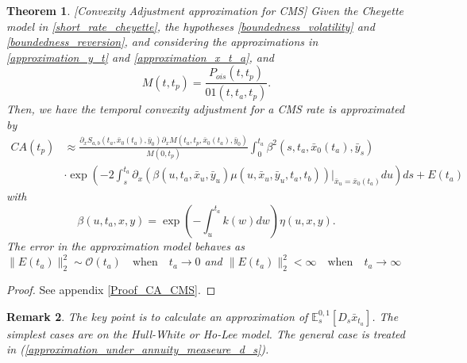\documentclass[a4paper,10pt]{article}
\newtheorem{theorem}{Theorem}[section]
\newtheorem{remark}[theorem]{Remark}
\newcommand{\1}{\mathbf{1}}
\begin{document}
\begin{theorem}\label{Th_CA_CMS}[Convexity Adjustment approximation for CMS]
Given the Cheyette model in \eqref{short_rate_cheyette}, the hypotheses \ref{boundedness_volatility} and \ref{boundedness_reversion}, and considering the approximations in \eqref{approximation_y_t} and \eqref{approximation_x_t_a}, and
\begin{equation}
M(t,t_p)= \frac{P_{ois}(t,t_p)}{01(t,t_a,t_p)}.
\end{equation}
Then, we have the temporal convexity adjustment for a CMS rate is approximated by
\begin{align} \label{cms_first_order_convexity}
CA(t_p) &\approx  \frac{\partial_x S_{a,b}(t_a,\bar{x}_0(t_a), \bar{y}_0) \partial_x M(t_a,t_p,\bar{x}_0(t_a), \bar{y}_0)}{M(0,t_p)} \int_{0}^{t_a}  \beta^2(s,t_a,\bar{x}_0(t_a),\bar{y}_s) \\
&\cdot  \exp\left(-2\int_{s}^{t_a}\partial_x (\beta(u,t_a,\bar{x}_u,\bar{y}_u) \mu(u,\bar{x}_u, \bar{y}_u,t_a,t_b))|_{\bar{x}_u=\bar{x}_{0}(t_a)}  du \right)ds + E(t_a)\nonumber 
\end{align}
with  
\begin{equation*}
\beta(u,t_a,x,y) = \exp\left(-\int_{u}^{t_a}k(w) dw\right)\eta(u,x,y).
\end{equation*} 
The error in the approximation model behaves as $\|E(t_a)\|^{2}_{2} \sim \mathcal{O}(t_a) \quad \text{when} \quad t_a \to 0$ and $\|E(t_a)\|^{2}_{2} < \infty \quad \text{when} \quad t_a \to \infty$
\end{theorem}
\begin{proof}
See appendix \ref{Proof_CA_CMS}.
\end{proof}

\begin{remark}
The key point is to calculate an approximation of $\mathbb{E}_s^{0,1}\left[ D_s \bar{x}_{t_a}\right]$. The simplest cases are on the Hull-White or Ho-Lee model. The general case is treated in (\ref{approximation_under_annuity_measeure_d_s}). 
\end{remark}
\end{document}
